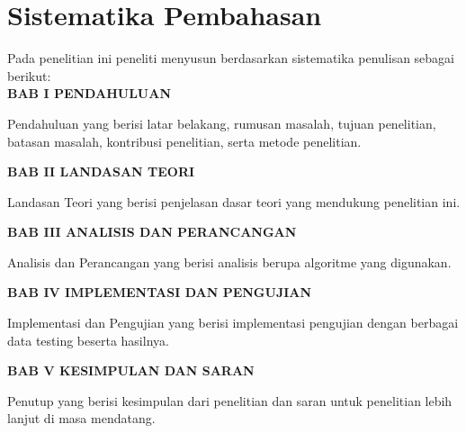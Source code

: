 \section{Sistematika Pembahasan}
\noindent Pada penelitian ini peneliti menyusun berdasarkan sistematika penulisan sebagai berikut: \\[0.5cm]
\noindent \textbf{BAB I \hspace{1cm} PENDAHULUAN}
\begin{addmargin}[2.35cm]{0em}
Pendahuluan yang berisi latar belakang, rumusan masalah, tujuan penelitian, batasan masalah, kontribusi penelitian, serta metode penelitian.
\end{addmargin}
\noindent \textbf{BAB II \hspace{0.8cm} LANDASAN TEORI}
\begin{addmargin}[2.35cm]{0em}
Landasan Teori yang berisi penjelasan dasar teori yang mendukung penelitian ini.
\end{addmargin}
\noindent \textbf{BAB III \hspace{0.7cm} ANALISIS DAN PERANCANGAN}
\begin{addmargin}[2.35cm]{0em}
Analisis dan Perancangan yang berisi analisis berupa algoritme yang digunakan.
\end{addmargin}
\noindent \textbf{BAB IV \hspace{0.7cm} IMPLEMENTASI DAN PENGUJIAN}
\begin{addmargin}[2.35cm]{0em}
Implementasi dan Pengujian yang berisi implementasi pengujian dengan berbagai data testing beserta hasilnya.
\end{addmargin}
\noindent \textbf{BAB V \hspace{0.8cm} KESIMPULAN DAN SARAN}
\begin{addmargin}[2.35cm]{0em}
Penutup yang berisi kesimpulan dari penelitian dan saran untuk penelitian lebih lanjut di masa mendatang.
\end{addmargin}

\newpage